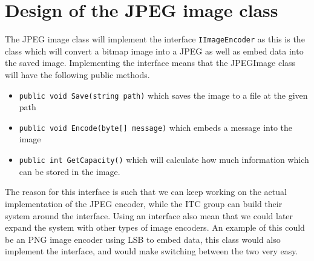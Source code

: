 \section{Design of the JPEG image class}

The JPEG image class will implement the interface \lstinline|IImageEncoder| as this is the class which will convert a bitmap image into a JPEG as well as embed data into the saved image. Implementing the interface means that the JPEGImage class will have the following public methods.

\begin{itemize}
	\item \lstinline|public void Save(string path)| which saves the image to a file at the given path
	\item \lstinline|public void Encode(byte[] message)| which embeds a message into the image
	\item \lstinline|public int GetCapacity()| which will calculate how much information which can be stored in the image. 
\end{itemize}

The reason for this interface is such that we can keep working on the actual implementation of the JPEG encoder, while the ITC group can build their system around the interface. Using an interface also mean that we could later expand the system with other types of image encoders. An example of this could be an PNG image encoder using LSB to embed data, this class would also implement the interface, and would make switching between the two very easy. 


